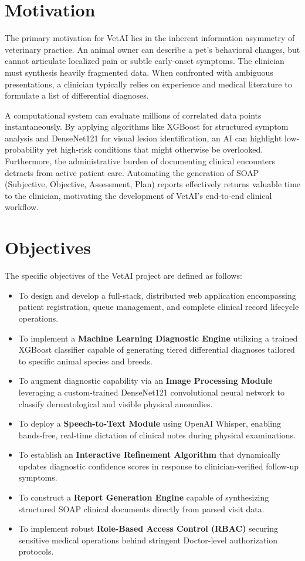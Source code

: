 \documentclass[a4paper,12pt]{report}
\begin{document}
\section{Motivation}

The primary motivation for VetAI lies in the inherent information asymmetry of veterinary practice. An animal owner can describe a pet's behavioral changes, but cannot articulate localized pain or subtle early-onset symptoms. The clinician must synthesis heavily fragmented data. When confronted with ambiguous presentations, a clinician typically relies on experience and medical literature to formulate a list of differential diagnoses. 

A computational system can evaluate millions of correlated data points instantaneously. By applying algorithms like XGBoost for structured symptom analysis and DenseNet121 for visual lesion identification, an AI can highlight low-probability yet high-risk conditions that might otherwise be overlooked. Furthermore, the administrative burden of documenting clinical encounters detracts from active patient care. Automating the generation of SOAP (Subjective, Objective, Assessment, Plan) reports effectively returns valuable time to the clinician, motivating the development of VetAI's end-to-end clinical workflow.

\section{Objectives}

The specific objectives of the VetAI project are defined as follows:

\begin{itemize}
    \item To design and develop a full-stack, distributed web application encompassing patient registration, queue management, and complete clinical record lifecycle operations.
    \item To implement a \textbf{Machine Learning Diagnostic Engine} utilizing a trained XGBoost classifier capable of generating tiered differential diagnoses tailored to specific animal species and breeds.
    \item To augment diagnostic capability via an \textbf{Image Processing Module} leveraging a custom-trained DenseNet121 convolutional neural network to classify dermatological and visible physical anomalies.
    \item To deploy a \textbf{Speech-to-Text Module} using OpenAI Whisper, enabling hands-free, real-time dictation of clinical notes during physical examinations.
    \item To establish an \textbf{Interactive Refinement Algorithm} that dynamically updates diagnostic confidence scores in response to clinician-verified follow-up symptoms.
    \item To construct a \textbf{Report Generation Engine} capable of synthesizing structured SOAP clinical documents directly from parsed visit data.
    \item To implement robust \textbf{Role-Based Access Control (RBAC)} securing sensitive medical operations behind stringent Doctor-level authorization protocols.
\end{itemize}
\end{document}
